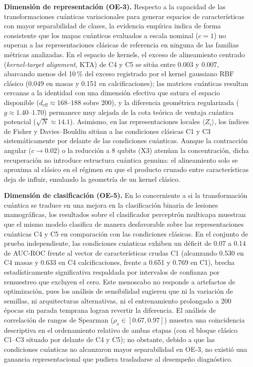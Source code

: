 \textbf{Dimensión de representación (OE-3).} Respecto a la capacidad de las transformaciones cuánticas
variacionales para generar espacios de características con mayor separabilidad de clases, la evidencia empírica
indica de forma consistente que los mapas cuánticos evaluados a escala nominal ($c = 1$) no superan a las
representaciones clásicas de referencia en ninguna de las familias métricas analizadas. En el espacio de kernels,
el exceso de alineamiento centrado (\textit{kernel-target alignment}, KTA) de C4 y C5 se sitúa entre 0.003 y 0.007,
abarcando menos del 10\,\% del exceso registrado por el kernel gaussiano RBF clásico (0.049 en masas y 0.151 en
calcificaciones); las matrices cuánticas resultan cercanas a la identidad con una dimensión efectiva que satura
el espacio disponible ($d_{\mathrm{eff}} \approx 168$--$188$ sobre 200), y la diferencia geométrica regularizada
($g \approx 1.40$--$1.70$) permanece muy alejada de la cota teórica de ventaja cuántica potencial ($\sqrt{N} \approx 14.1$).
Asimismo, en las representaciones locales $\langle Z_i \rangle$, los índices de Fisher y Davies--Bouldin sitúan a
las condiciones clásicas C1 y C3 sistemáticamente por delante de las condiciones cuánticas. Aunque la contracción
angular ($c \to 0.02$) o la reducción a 8 qubits (X3) atenúan la concentración, dicha recuperación no introduce
estructura cuántica genuina: el alineamiento solo se aproxima al clásico en el régimen en que el producto cruzado
entre características deja de influir, emulando la geometría de un kernel clásico.

\textbf{Dimensión de clasificación (OE-5).} En lo concerniente a si la transformación cuántica se traduce en una
mejora en la clasificación binaria de lesiones mamográficas, los resultados sobre el clasificador perceptrón multicapa
muestran que el mismo modelo clasifica de manera desfavorable sobre las representaciones cuánticas C4 y C5 en comparación
con las condiciones clásicas. En el conjunto de prueba independiente, las condiciones cuánticas exhiben un déficit de
0.07 a 0.14 de AUC-ROC frente al vector de características crudas C1 (alcanzando 0.530 en C4 masas y 0.633 en C4 calcificaciones,
frente a 0.651 y 0.769 en C1), brecha estadísticamente significativa respaldada por intervalos de confianza por remuestreo
que excluyen el cero. Este menoscabo no responde a artefactos de optimización, pues los análisis de sensibilidad sugieren
que ni la variación de semillas, ni arquitecturas alternativas, ni el entrenamiento prolongado a 200 épocas sin parada temprana
logran revertir la diferencia. El análisis de correlación de rangos de Spearman ($\rho_s \in [0.67, 0.97]$) muestra una coincidencia
descriptiva en el ordenamiento relativo de ambas etapas (con el bloque clásico C1--C3 situado por delante de C4 y C5); no obstante, debido a que
las condiciones cuánticas no alcanzaron mayor separabilidad en OE-3, no existió una ganancia representacional que pudiera
trasladarse al desempeño diagnóstico.

